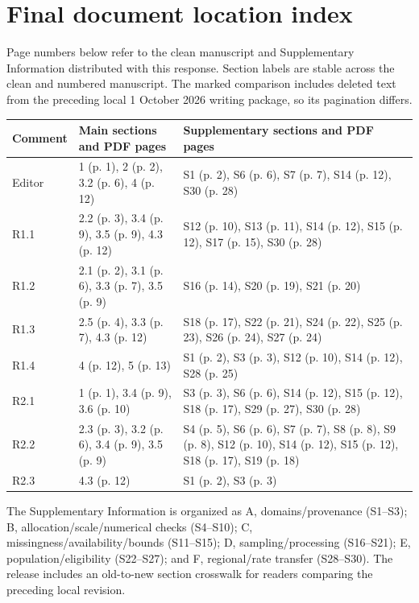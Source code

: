 \clearpage\section*{Final document location index}
Page numbers below refer to the clean manuscript and Supplementary Information distributed with this response. Section labels are stable across the clean and numbered manuscript. The marked comparison includes deleted text from the preceding local 1 October 2026 writing package, so its pagination differs.

\small\setlength{\tabcolsep}{4pt}
\begin{tabular}{p{.10\linewidth}p{.33\linewidth}p{.48\linewidth}}\toprule
Comment & Main sections and PDF pages & Supplementary sections and PDF pages\\\midrule
Editor & 1 (p. 1), 2 (p. 2), 3.2 (p. 6), 4 (p. 12) & S1 (p. 2), S6 (p. 6), S7 (p. 7), S14 (p. 12), S30 (p. 28) \\
R1.1 & 2.2 (p. 3), 3.4 (p. 9), 3.5 (p. 9), 4.3 (p. 12) & S12 (p. 10), S13 (p. 11), S14 (p. 12), S15 (p. 12), S17 (p. 15), S30 (p. 28) \\
R1.2 & 2.1 (p. 2), 3.1 (p. 6), 3.3 (p. 7), 3.5 (p. 9) & S16 (p. 14), S20 (p. 19), S21 (p. 20) \\
R1.3 & 2.5 (p. 4), 3.3 (p. 7), 4.3 (p. 12) & S18 (p. 17), S22 (p. 21), S24 (p. 22), S25 (p. 23), S26 (p. 24), S27 (p. 24) \\
R1.4 & 4 (p. 12), 5 (p. 13) & S1 (p. 2), S3 (p. 3), S12 (p. 10), S14 (p. 12), S28 (p. 25) \\
R2.1 & 1 (p. 1), 3.4 (p. 9), 3.6 (p. 10) & S3 (p. 3), S6 (p. 6), S14 (p. 12), S15 (p. 12), S18 (p. 17), S29 (p. 27), S30 (p. 28) \\
R2.2 & 2.3 (p. 3), 3.2 (p. 6), 3.4 (p. 9), 3.5 (p. 9) & S4 (p. 5), S6 (p. 6), S7 (p. 7), S8 (p. 8), S9 (p. 8), S12 (p. 10), S14 (p. 12), S15 (p. 12), S18 (p. 17), S19 (p. 18) \\
R2.3 & 4.3 (p. 12) & S1 (p. 2), S3 (p. 3) \\
\bottomrule\end{tabular}\normalsize

The Supplementary Information is organized as A, domains/provenance (S1--S3); B, allocation/scale/numerical checks (S4--S10); C, missingness/availability/bounds (S11--S15); D, sampling/processing (S16--S21); E, population/eligibility (S22--S27); and F, regional/rate transfer (S28--S30). The release includes an old-to-new section crosswalk for readers comparing the preceding local revision.
